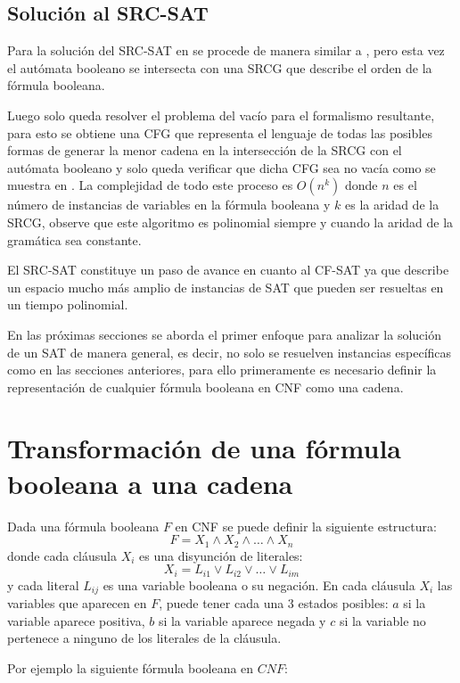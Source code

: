 \documentclass[12pt]{article}
\begin{document}
\subsection{Solución al SRC-SAT}

Para la solución del SRC-SAT en \cite{aSRCSAT} se procede de manera similar a \cite{aCFSAT}, pero esta vez el autómata
booleano se intersecta con una SRCG que describe el orden de la fórmula booleana.

Luego solo queda resolver el problema del vacío para el formalismo resultante, para esto se obtiene una CFG que representa 
el lenguaje de todas las posibles formas de generar la menor cadena en la intersección de la SRCG con el autómata booleano 
y solo queda verificar que dicha CFG sea no vacía como se muestra en \cite{aCFSAT}. La complejidad de todo este proceso es 
$O(n^k)$ donde $n$ es el número de instancias de variables en la fórmula booleana y $k$ es la aridad de la SRCG, observe 
que este algoritmo es polinomial siempre y cuando la aridad de la gramática sea constante.

El SRC-SAT constituye un paso de avance en cuanto al CF-SAT ya que describe un espacio mucho más amplio de instancias de SAT
que pueden ser resueltas en un tiempo polinomial.

En las próximas secciones se aborda el primer enfoque para analizar la solución de un SAT de manera general, es decir, no solo
se resuelven instancias específicas como en las secciones anteriores, para ello primeramente es necesario definir la representación
de cualquier fórmula booleana en CNF como una cadena. 

\section{Transformación de una fórmula booleana a una cadena}

Dada una fórmula booleana $F$ en CNF se puede definir la siguiente estructura:
$$F=X_1 \wedge X_2 \wedge \ldots \wedge X_n$$
donde cada cláusula $X_i$ es una disyunción de literales:
$$X_i=L_{i1} \vee L_{i2} \vee \ldots \vee L_{im}$$
y cada literal $L_{ij}$ es una variable booleana o su negación. En cada cláusula $X_i$ las variables que aparecen en $F$, puede tener cada una 3 estados posibles: $a$ si la variable aparece positiva, $b$ si la variable aparece negada y $c$ si la variable no pertenece a ninguno de los literales de la cláusula.

Por ejemplo la siguiente fórmula booleana en $CNF$:
\end{document}
